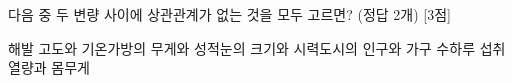 다음 중 두 변량 사이에 상관관계가 없는 것을 모두 고르면? (정답 2개) \mbox{[3점]}
\begin{choicesii}{해발 고도와 기온}{가방의 무게와 성적}{눈의 크기와 시력}{도시의 인구와 가구 수}{하루 섭취 열량과 몸무게}\end{choicesii}
